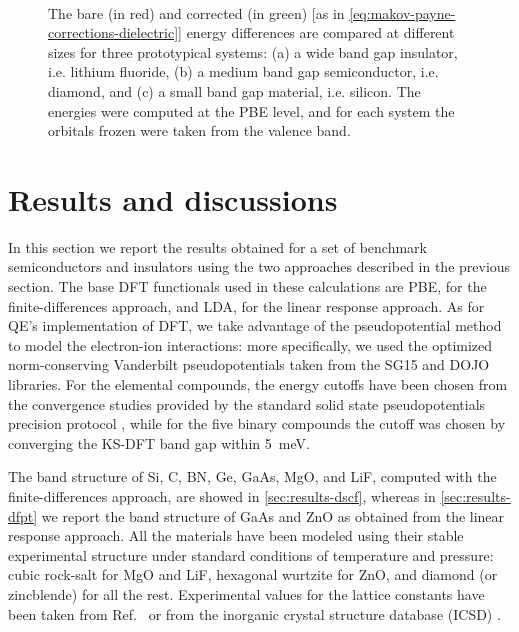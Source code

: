 \begin{figure}
    \centering
     \\
    \caption[Convergence finite-size corrections for the finite-differences method]{The bare (in red) and corrected (in green) [as in \cref{eq:makov-payne-corrections-dielectric}] energy differences are compared at different sizes for three prototypical systems: (a) a wide band gap insulator, i.e. lithium fluoride, (b) a medium band gap semiconductor, i.e. diamond, and (c) a small band gap material, i.e. silicon. The energies were computed at the PBE level, and for each system the orbitals frozen were taken from the valence band.}
    \label{fig:convergence-makov-payne}
\end{figure}

\section{Results and discussions\label{sec:results-bands}}
In this section we report the results obtained for a set of benchmark semiconductors and insulators using the two approaches described in the previous section. The base DFT functionals used in these calculations are PBE, for the finite-differences approach, and LDA, for the linear response approach. As for QE's implementation of DFT, we take advantage of the pseudopotential method to model the electron-ion interactions: more specifically, we used the optimized norm-conserving Vanderbilt pseudopotentials \cite{hamann_optimized_2013,hamann_erratum_2017} taken from the SG15 \cite{schlipf_optimization_2015} and DOJO \cite{van_setten_pseudodojo_2018} libraries. For the elemental compounds, the energy cutoffs have been chosen from the convergence studies provided by the standard solid state pseudopotentials precision protocol \cite{prandini_precision_2018}, while for the five binary compounds the cutoff was chosen by converging the KS-DFT band gap within 5~\si{\milli\electronvolt}.

The band structure of Si, C, BN, Ge, GaAs, MgO, and LiF, computed with the finite-differences approach, are showed in \cref{sec:results-dscf}, whereas in \cref{sec:results-dfpt} we report the band structure of GaAs and ZnO as obtained from the linear response approach. All the materials have been modeled using their stable experimental structure under standard conditions of temperature and pressure: cubic rock-salt for MgO and LiF, hexagonal wurtzite for ZnO, and diamond (or zincblende) for all the rest. Experimental values for the lattice constants have been taken from Ref.~\cite{madelung_semiconductors_2004} or from the inorganic crystal structure database (ICSD) \cite{icsd_website}.

